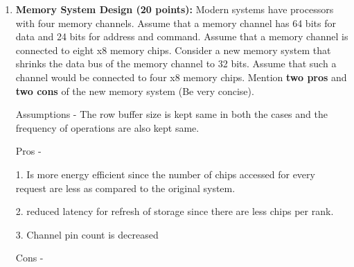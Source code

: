 \documentclass[a4paper, 11pt]{exam}
\begin{document}
\begin{enumerate}

 
\item \textbf{Memory System Design (20 points): } Modern systems have processors with four memory channels. Assume that a memory channel has 64 bits for data and 24 bits for address and command.
Assume that a memory channel is connected to eight x8 memory chips. Consider a new memory system that shrinks the data bus of the memory channel to 32 bits. Assume that such a channel would be connected to four x8 memory chips. Mention \textbf{two pros} and \textbf{two cons} of the new memory system (Be very concise).\newline

Assumptions - The row buffer size is kept same in both the cases and the frequency of operations are also kept same.

Pros -

1. Is more energy efficient since the number of chips accessed for every request are less as compared to the original system.

2. reduced latency for refresh of storage since there are less chips per rank.

3. Channel pin count is decreased  


Cons -
 

\end{enumerate}
\end{document}
